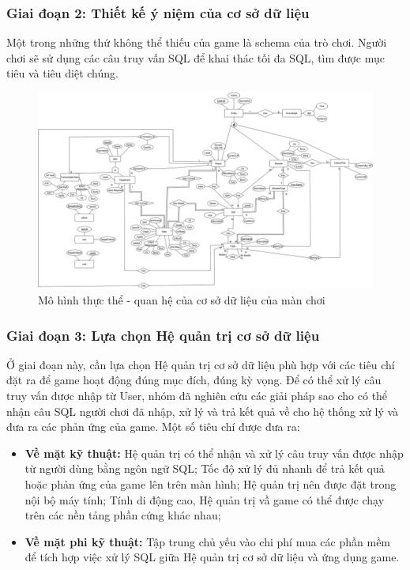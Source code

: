 \subsubsection{Giai đoạn 2: Thiết kế ý niệm của cơ sở dữ liệu}
\hspace*{0.5cm} Một trong những thứ không thể thiếu của game là schema của trò chơi. Người chơi sẽ sử dụng các câu truy vấn SQL để khai thác tối đa SQL, tìm được mục tiêu và tiêu diệt chúng.
\begin{figure}[H]
	\centering
	\includegraphics[width=\textwidth]{Images/EERD_v3.png}
	\vspace{0.5cm}
	\caption{Mô hình thực thể - quan hệ của cơ sở dữ liệu của màn chơi}
\end{figure}

\subsubsection{Giai đoạn 3: Lựa chọn Hệ quản trị cơ sở dữ liệu}
\hspace*{0.5cm} Ở giai đoạn này, cần lựa chọn Hệ quản trị cơ sở dữ liệu phù hợp với các tiêu chí đặt ra để game hoạt động đúng mục đích, đúng kỳ vọng. Để có thể xử lý câu truy vấn được nhập từ User, nhóm đã nghiên cứu các giải pháp sao cho có thể nhận câu SQL người chơi đã nhập, xử lý và trả kết quả về cho hệ thống xử lý và đưa ra các phản ứng của game. Một số tiêu chí được đưa ra:
\begin{itemize}
	\item \textbf{Về mặt kỹ thuật: } Hệ quản trị có thể nhận và xử lý câu truy vấn được nhập từ người dùng bằng ngôn ngữ SQL; Tốc độ xử lý đủ nhanh để trả kết quả hoặc phản ứng của game lên trên màn hình; Hệ quản trị nên được đặt trong nội bộ máy tính; Tính di động cao, Hệ quản trị vầ game có thể được chạy trên các nền tảng phần cứng khác nhau;
	\item \textbf{Về mặt phi kỹ thuật: } Tập trung chủ yếu vào chi phí mua các phần mềm để tích hợp việc xử lý SQL giữa Hệ quản trị cơ sở dữ liệu và ứng dụng game. 
\end{itemize}

